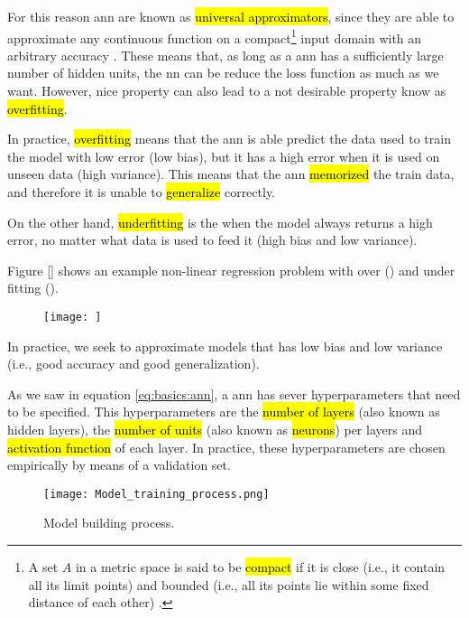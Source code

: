 For this reason \gls{ann} are known as \hl{universal approximators}, since they are able to approximate any continuous function on a compact\footnote{A set $A$ in a metric space is said to be \hl{compact} if it is close (i.e., it contain all its limit points) and bounded (i.e., all its points lie within some fixed distance of each other) \cite{bartle2000introduction}.} input domain with an arbitrary accuracy \cite{bishop2006pattern}. These means that, as long as a \gls{ann} has a sufficiently large number of hidden units, the nn can be reduce the loss function as much as we want. However, nice property can also lead to a not desirable property know as \hl{overfitting}.

In practice, \hl{overfitting} means that the ann is able predict the data used to train the model with low error (low bias), but it has a high error when it is used on unseen data (high variance). This means that the ann \hl{memorized} the train data, and therefore it is unable to \hl{generalize} correctly.

On the other hand, \hl{underfitting} is the when the model always returns a high error, no matter what data is used to feed it (high bias and low variance).

Figure \ref{} shows an example non-linear regression problem with over (\subfig{}) and under fitting (\subfig{}).

\begin{figure}[!ht]
  \centering
  \texttt{[image: ]}
  \caption{}
  \label{fig:basics:ann:over_under_fitting}
\end{figure}

In practice, we seek to approximate models that has low bias and low variance (i.e., good accuracy and good generalization).


As we saw in equation \ref{eq:basics:ann}, a \gls{ann} has sever hyperparameters that need to be specified. This hyperparameters are the \hl{number of layers} (also known as hidden layers), the \hl{number of units} (also known as \hl{neurons}) per layers and \hl{activation function} of each layer. In practice, these hyperparameters are chosen empirically by means of a validation set.

\begin{figure}[!ht]
  \centering
  \texttt{[image: Model\_training\_process.png]}
  \caption{Model building process.}
  \label{fig:basics:model_train_process}
\end{figure}
